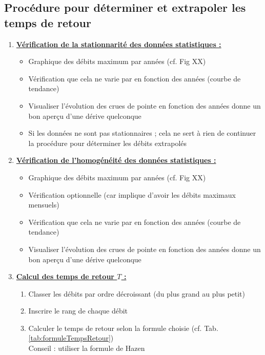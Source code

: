 \subsection{Procédure pour déterminer et extrapoler les temps de retour}
\begin{enumerate}
    \item \textbf{\underline{Vérification de la stationnarité des données statistiques :}} \\
    \begin{itemize}
        \item Graphique des débits maximum par années (cf. Fig XX)
        \item Vérification que cela ne varie par en fonction des années (courbe de tendance)
        \item Visualiser l'évolution des crues de pointe en fonction des années donne un bon aperçu d'une dérive quelconque
        \item \Warning Si les données ne sont pas stationnaires ; cela ne sert à rien de continuer la procédure pour déterminer les débits extrapolés
    \end{itemize}
    \bigskip
    \item \textbf{\underline{Vérification de l'homogénéité des données statistiques :}}
    \begin{itemize}
        \item Graphique des débits maximum par années (cf. Fig XX)
        \item Vérification optionnelle (car implique d'avoir les débits maximaux mensuels)
        \item Vérification que cela ne varie par en fonction des années (courbe de tendance)
        \item Visualiser l'évolution des crues de pointe en fonction des années donne un bon aperçu d'une dérive quelconque
    \end{itemize}
    \bigskip
    \item \textbf{\underline{Calcul des temps de retour $T$ :}}
    \begin{enumerate}
        \item Classer les débits par ordre décroissant (du plus grand au plus petit)
        \item Inscrire le rang de chaque débit
        \item Calculer le temps de retour selon la formule choisie (cf. Tab. \ref{tab:formuleTempsRetour}) \\
        Conseil : utiliser la formule de Hazen
    \end{enumerate}

\end{enumerate}
